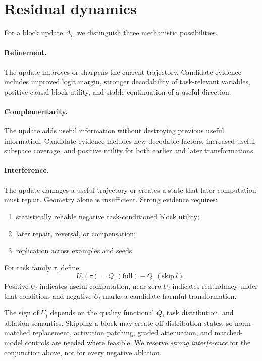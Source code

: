 \documentclass[10pt]{article}
\begin{document}
\section{Residual dynamics}
For a block update $\Delta_l$, we distinguish three mechanistic possibilities.

\paragraph{Refinement.}
The update improves or sharpens the current trajectory. Candidate evidence includes improved logit margin, stronger decodability of task-relevant variables, positive causal block utility, and stable continuation of a useful direction.

\paragraph{Complementarity.}
The update adds useful information without destroying previous useful information. Candidate evidence includes new decodable factors, increased useful subspace coverage, and positive utility for both earlier and later transformations.

\paragraph{Interference.}
The update damages a useful trajectory or creates a state that later computation must repair. Geometry alone is insufficient. Strong evidence requires:
\begin{enumerate}[leftmargin=*]
\item statistically reliable negative task-conditioned block utility;
\item later repair, reversal, or compensation;
\item replication across examples and seeds.
\end{enumerate}

For task family $\tau$, define:
\[
U_l(\tau)=Q_\tau(\mathrm{full})-Q_\tau(\mathrm{skip}\ l).
\]
Positive $U_l$ indicates useful computation, near-zero $U_l$ indicates redundancy under that condition, and negative $U_l$ marks a candidate harmful transformation.

The sign of $U_l$ depends on the quality functional $Q$, task distribution, and ablation semantics. Skipping a block may create off-distribution states, so norm-matched replacement, activation patching, graded attenuation, and matched-model controls are needed where feasible. We reserve \emph{strong interference} for the conjunction above, not for every negative ablation.
\end{document}
